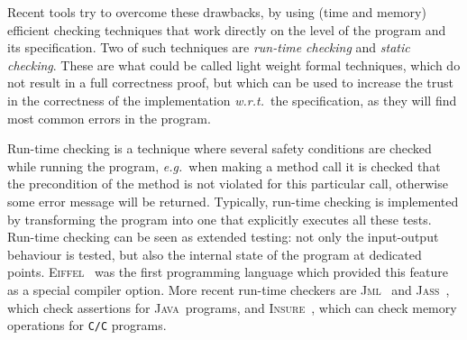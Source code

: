 \documentclass[a4paper]{llncs}
\newcommand{\jml}{\textsc{Jml}}
\newcommand{\eiffel}{\textsc{Eiffel}}
\newcommand{\jass}{\textsc{Jass}}
\newcommand{\java}{\textsc{Java}}
\newcommand{\cPP}{\texttt{C/C}\nolinebreak\hspace{-.05em}\raisebox{.4ex}{\tiny\bf
+}\nolinebreak\hspace{-.10em}\raisebox{.4ex}{\tiny\bf +}}
\newcommand{\insPP}{\textsc{Insure\nolinebreak\hspace{-.05em}\raisebox{.4ex}{\tiny\bf
+}\nolinebreak\hspace{-.10em}\raisebox{.4ex}{\tiny\bf +}}}
\begin{document}

Recent tools try to overcome these drawbacks, by using (time and
memory) efficient checking techniques that work directly on the level
of the program and its specification. Two of such techniques are
\textit{run-time checking} and \textit{static checking}. 
These are what could be called light weight formal techniques, which
do not result in a full correctness proof, but which can be used to
increase the trust in the correctness of the implementation
\emph{w.r.t.}~the specification, as they will find most common
errors in the program.

Run-time checking is a technique where several safety conditions are
checked while running the program, \emph{e.g.}~when making a method
call it is checked that the precondition of the method is not violated
for this particular call, otherwise some error message will be
returned. Typically, run-time checking is implemented by transforming
the program into one that explicitly executes all these
tests. Run-time checking can be seen as extended testing: not only the
input-output behaviour is tested, but also the internal state of the
program at dedicated points. \eiffel~\cite{Meyer97} was the first
programming language which provided this feature as a special compiler
option. More recent run-time checkers are \jml~\cite{LeavensBR00} and
\jass~\cite{bartetzko01assertions}, which check assertions for \java\
programs, and
\insPP~\cite{InsurePP}, which can check memory operations for \cPP
programs. %


\end{document}
